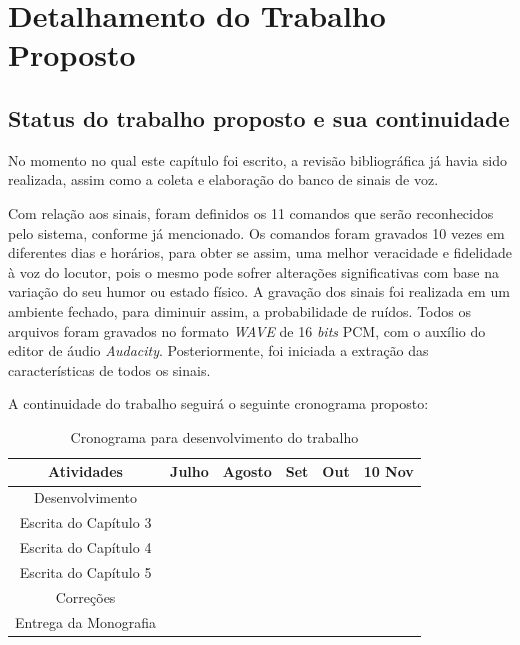 \documentclass[a4paper,12pt,twoside,openright]{report}
\begin{document}
\chapter{Detalhamento do Trabalho Proposto}
\label{cap3}
\thispagestyle{myheadings}
\section{Status do trabalho proposto e sua continuidade}
\par No momento no qual este cap\'{i}tulo foi escrito, a revis\~{a}o bibliogr\'{a}fica j\'{a} havia sido realizada, assim como a coleta e elabora{\c c}\~{a}o do banco de sinais de voz.
\\
\par Com rela\c{c}\~{a}o aos sinais, foram definidos os 11 comandos que ser\~{a}o reconhecidos pelo sistema, conforme j\'{a} mencionado. Os comandos foram gravados 10 vezes em diferentes dias e hor\'{a}rios, para obter se assim, uma melhor veracidade e fidelidade \`{a} voz do locutor, pois o mesmo pode sofrer altera{\c c}\~{o}es significativas com base na varia{\c c}\~{a}o do seu humor ou estado f\'{i}sico. A grava{\c c}\~{a}o dos sinais foi realizada em um ambiente fechado, para diminuir assim, a probabilidade de ru\'{i}dos. Todos os arquivos foram gravados no formato  \textit{WAVE} de 16 \textit{bits} PCM, com o aux\'{i}lio do editor de \'{a}udio \textit{Audacity}. Posteriormente, foi iniciada a extra{\c c}\~{a}o das caracter\'{i}sticas de todos os sinais.
\\
\par A continuidade do trabalho seguir\'{a} o seguinte cronograma proposto:

\begin{table}[H]
	\centering
	\caption{Cronograma para desenvolvimento do trabalho}
	\begin{tabular}{|c|c|c|c|c|c|}
		\hline
		Atividades & Julho & Agosto & Set & Out & 10 Nov \\
		\hline
		 Desenvolvimento & \cellcolor{blue!25} &\cellcolor{blue!25} & & &  \\
		\hline
		  Escrita do Cap\'{i}tulo 3 &  &  & \cellcolor{blue!25} &  &  \\
		  \hline
		  Escrita do Cap\'{i}tulo 4 & & & &\cellcolor{blue!25} & \\
		  \hline
		  Escrita do Cap\'{i}tulo 5 & & & & \cellcolor{blue!25} &\\
		  \hline
		  Corre{\c c}\~{o}es & & & & \cellcolor{blue!25} & \\
		  \hline
		  Entrega da Monografia & & & & & \cellcolor{blue!25} \\
		  \hline
	\end{tabular}
	\label{cronograma}
\end{table}
\end{document}
